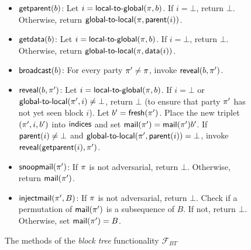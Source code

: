 \begin{figure*}
{\begin{minipage}{0.9 \textwidth}
\begin{itemize}
            If $X = 0$, then the return $\bot$, indicating that
            mining has been unsuccessful. Otherwise, increment
            $\blocks$ indicating that mining has been successful and
            place $(\party, \blocks, b')$ into
            $\indices$, where $b' = \fresh(\party)$.
            Set $\parent(\blocks) = i$ and $\data(\blocks) = \vec{x}$.
            Finally, return $b'$.
      \item $\textsf{getparent}(b)$:
            Let $i = \textsf{local-to-global}(\pi, b)$. If $i = \bot$, return $\bot$.
            Otherwise, return $\textsf{global-to-local}(\pi, \textsf{parent}(i))$.
      \item $\textsf{getdata}(b)$:
            Let $i = \textsf{local-to-global}(\pi, b)$. If $i = \bot$, return $\bot$.
            Otherwise, return $\textsf{global-to-local}(\pi, \textsf{data}(i))$.
      \item $\textsf{broadcast}(b)$:
            For every party $\pi' \neq \pi$, invoke
            $\textsf{reveal}(b, \pi')$.
      \item $\textsf{reveal}(b, \pi')$:
            Let $i = \textsf{local-to-global}(\pi, b)$. If
            $i = \bot$ or $\textsf{global-to-local}(\pi', i) \neq \bot$,
            return $\bot$ (to ensure that party $\pi'$ has
            not yet seen block $i$). Let
            $b' = \textsf{fresh}(\pi')$.
            Place the new triplet $(\pi', i, b')$ into $\indices$ and
            set $\textsf{mail}(\pi') = \textsf{mail}(\pi') b'$.
            If $\textsf{parent}(i) \neq \bot$ and $\textsf{global-to-local}(\pi', \textsf{parent}(i)) = \bot$,
            invoke $\textsf{reveal}(\textsf{getparent}(i), \pi')$.
      \item $\textsf{snoopmail}(\pi')$:
            If $\pi$ is not adversarial, return $\bot$. Otherwise, return
            $\textsf{mail}(\pi')$.
      \item $\textsf{injectmail}(\pi', B)$:
            If $\pi$ is not adversarial, return $\bot$.
            Check if a permutation of $\textsf{mail}(\pi')$ is a subsequence of $B$.
            If not, return $\bot$. Otherwise, set $\textsf{mail}(\pi') = B$.
  \end{itemize}

	\end{minipage}
}
\caption{
The methods of the \emph{block tree} functionality $\mathcal{F}_{BT}$
\label{fig:blocktree2}
}
\end{figure*}
